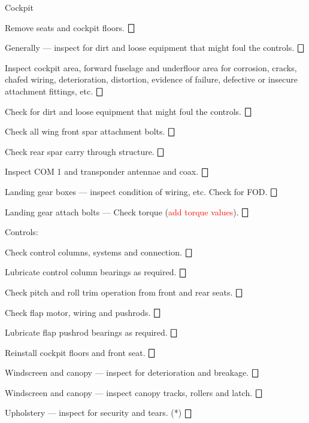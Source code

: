 \begin{enumerate*}
	\item{Cockpit} 
	\begin{enumerate*}
		\item Remove seats and cockpit floors.  \dotfill $\bigbox$
		\item Generally --- inspect for dirt and loose equipment that might foul the controls. \dotfill $\bigbox$
		\item Inspect cockpit area, forward fuselage and underfloor area for corrosion, cracks, chafed wiring, deterioration, distortion, evidence of failure, defective or insecure attachment fittings, etc.  \dotfill $\bigbox$
		\item Check for dirt and loose equipment that might foul the controls. \dotfill $\bigbox$
		\item Check all wing front spar attachment bolts. \dotfill $\bigbox$
		\item Check rear spar carry through structure. \dotfill $\bigbox$
		\item Inspect COM 1 and transponder antennae and coax. \dotfill $\bigbox$
		\item Landing gear boxes --- inspect condition of wiring, etc.  Check for FOD. \dotfill $\bigbox$
		\item Landing gear attach bolts --- Check torque (\textcolor{red}{add torque values}).  \dotfill $\bigbox$
		\item Controls:
  	\begin{enumerate*}
  		\item Check control columns, systems and connection. \dotfill $\bigbox$
  		\item Lubricate control column bearings as required. \dotfill $\bigbox$
  		\item Check pitch and roll trim operation from front and rear seats.  \dotfill $\bigbox$
  		\item Check flap motor, wiring and pushrods. \dotfill $\bigbox$
  		\item Lubricate flap pushrod bearings as required. \dotfill $\bigbox$
  	  \end{enumerate*}
		\item Reinstall cockpit floors and front seat.  \dotfill $\bigbox$
		\item Windscreen and canopy --- inspect for deterioration and breakage. \dotfill $\bigbox$
		\item Windscreen and canopy --- inspect canopy tracks, rollers and latch. \dotfill $\bigbox$
		\item Upholstery --- inspect for security and tears. (*) \dotfill $\bigbox$

\end{enumerate*}
\end{enumerate*}
